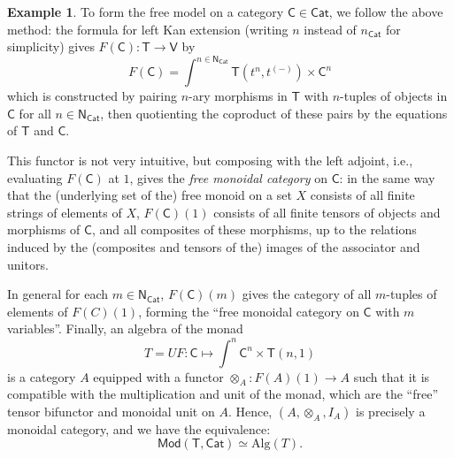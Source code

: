 \documentclass{amsart}
\theoremstyle{definition}
\newtheorem{example}[theorem]{Example}
\newcommand{\Cat}{\mathsf{Cat}}
\newcommand{\Mod}{\mathsf{Mod}}
\newcommand{\NN}{\mathsf{N}}
\newcommand{\V}{\mathsf{V}}
\newcommand{\C}{\mathsf{C}}
\newcommand{\T}{\mathsf{T}}
\newcommand{\maps}{\colon}
\begin{document}
\begin{example}
To form the free model on a category $\C\in \Cat$, we follow the above method: the formula for left Kan extension (writing $n$ instead of $n_\Cat$ for simplicity) gives $F(\C)\maps \T\to \V$ by 
\[   F(\C) = \int^{n\in \NN_\Cat} \T(t^{n},t^{(-)})\times \C^{n} \] 
which is constructed by pairing $n$-ary morphisms in $\T$ with $n$-tuples of objects in $\C$ for all $n\in \NN_\Cat$, then quotienting the coproduct of these pairs by the equations of $\T$ and $\C$.

This functor is not very intuitive, but composing with the left adjoint, i.e., evaluating $F(\C)$ at $1$, gives the \textit{free monoidal category} on $\C$: in the same way that the (underlying set of the) free monoid on a set $X$ consists of all finite strings of elements of $X$, $F(\C)(1)$ consists of all finite tensors of objects and morphisms of $\C$, and all composites of these morphisms, up to the relations induced by the (composites and tensors of the) images of the associator and unitors.

In general for each $m\in \NN_\Cat$, $F(\C)(m)$ gives the category of all $m$-tuples of elements of $F(C)(1)$, forming the ``free monoidal category on $\C$ with $m$ variables''.  Finally, an algebra of the monad 
\[  T = UF \maps \C \mapsto \int^n \C^n \times \T(n,1) \]
is a category $A$ equipped with a functor $\otimes_A\maps F(A)(1)\to A$ such that it is compatible with the multiplication and unit of the monad, which are the ``free'' tensor bifunctor and monoidal unit on $A$. Hence, $(A,\otimes_A,I_A)$ is precisely a monoidal category, and we have the equivalence: 
\[ \Mod(\T,\Cat) \simeq \mathrm{Alg}(T). \]
\end{example}
\end{document}
